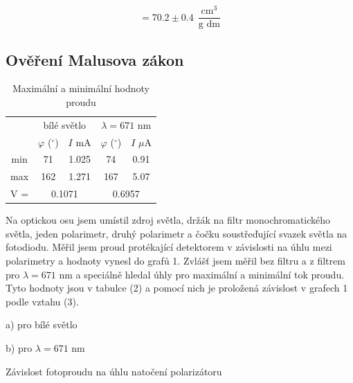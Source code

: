 \documentclass[a4paper,11pt]{article}
\begin{document}
\begin{equation*}
[\alpha] = 70.2 \pm 0.4 \ \ \frac{\text{cm}^{3}}{\text{g dm}}
\end{equation*}

\subsection{Ověření Malusova zákon}

\begin{table}
    \vspace{-10pt}
    \centering
    \begin{tabular}{ccccc}
        \hline\hline
        & \multicolumn{2}{c|}{bílé světlo} & \multicolumn{2}{c}{$\lambda = 671$ nm} \\
        & $ \varphi $ ($ ^{\circ} $) & \multicolumn{1}{c|}{$ I $ mA}  & $ \varphi $ ($ ^{\circ} $) & $ I $ $ \mu $A \\\hline
        min & 71 & 1.025 & 74 & 0.91 \\
        max & 162 & 1.271 & 167 & 5.07 \\\hline
        V =  & \multicolumn{2}{c}{0.1071} & \multicolumn{2}{c}{0.6957} \\
        \hline\hline
    \end{tabular}
    \caption{Maximální a minimální hodnoty proudu}
\end{table}

Na optickou osu jsem umístil zdroj světla, držák na filtr monochromatického světla, jeden polarimetr, druhý polarimetr a čočku soustřeďující svazek světla na fotodiodu. Měřil jsem proud protékající detektorem v závislosti na úhlu mezi polarimetry a hodnoty vynesl do grafů 1. Zvlášť jsem měřil bez filtru a z filtrem pro $ \lambda = 671 $ nm a speciálně hledal úhly pro maximální a minimální tok proudu. Tyto hodnoty jsou v tabulce (2) a pomocí nich je proložená závislost v grafech 1 podle vztahu (3). 

\begin{table}[htpb]
    \begin{minipage}[b]{.5\linewidth}
        \centering
        \captionsetup{labelformat=empty}
        \caption{a) pro bílé světlo}
        \resizebox{\textwidth}{!}{  }
    \end{minipage} 
    \hfill
    \begin{minipage}[b]{.5\linewidth}
        \centering
        \captionsetup{labelformat=empty}
        \caption{b) pro $\lambda = 671$ nm}
        \resizebox{\textwidth}{!}{  }
    \end{minipage} 
    \captionsetup{type=graph}
    \caption{Závislost fotoproudu na úhlu natočení polarizátoru}
\end{table}
\end{document}
